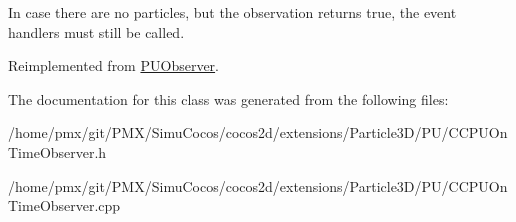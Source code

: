 In case there are no particles, but the observation returns true, the event handlers must still be called. 

Reimplemented from \hyperlink{classPUObserver}{P\+U\+Observer}.



The documentation for this class was generated from the following files\+:\begin{DoxyCompactItemize}
\item 
/home/pmx/git/\+P\+M\+X/\+Simu\+Cocos/cocos2d/extensions/\+Particle3\+D/\+P\+U/C\+C\+P\+U\+On\+Time\+Observer.\+h\item 
/home/pmx/git/\+P\+M\+X/\+Simu\+Cocos/cocos2d/extensions/\+Particle3\+D/\+P\+U/C\+C\+P\+U\+On\+Time\+Observer.\+cpp\end{DoxyCompactItemize}
